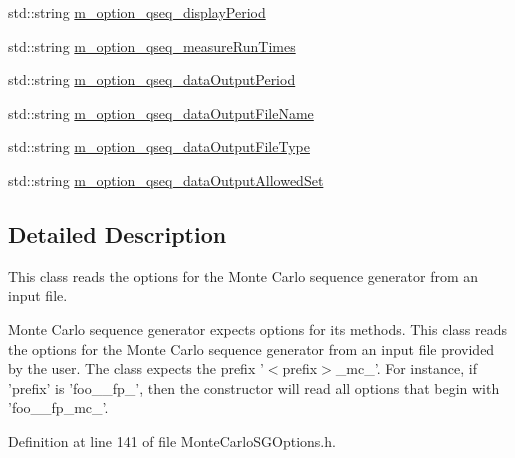 \begin{DoxyCompactItemize}
\item 
std\-::string \hyperlink{class_q_u_e_s_o_1_1_monte_carlo_s_g_options_a14d5adea03855e45e535cf10cf8ea3ae}{m\-\_\-option\-\_\-qseq\-\_\-display\-Period}
\item 
std\-::string \hyperlink{class_q_u_e_s_o_1_1_monte_carlo_s_g_options_a16456d0bcab4d4aca08b02f0ce123b07}{m\-\_\-option\-\_\-qseq\-\_\-measure\-Run\-Times}
\item 
std\-::string \hyperlink{class_q_u_e_s_o_1_1_monte_carlo_s_g_options_a604e3546503d8b7f9a8e0c48922b2ed7}{m\-\_\-option\-\_\-qseq\-\_\-data\-Output\-Period}
\item 
std\-::string \hyperlink{class_q_u_e_s_o_1_1_monte_carlo_s_g_options_a30620452f8188a0b4a0519bed24e64d1}{m\-\_\-option\-\_\-qseq\-\_\-data\-Output\-File\-Name}
\item 
std\-::string \hyperlink{class_q_u_e_s_o_1_1_monte_carlo_s_g_options_a7e07046865a2e99b61ac30b94dfc8306}{m\-\_\-option\-\_\-qseq\-\_\-data\-Output\-File\-Type}
\item 
std\-::string \hyperlink{class_q_u_e_s_o_1_1_monte_carlo_s_g_options_a2d464d948dabe4fd9fbd1e912537b3e0}{m\-\_\-option\-\_\-qseq\-\_\-data\-Output\-Allowed\-Set}
\end{DoxyCompactItemize}


\subsection{Detailed Description}
This class reads the options for the Monte Carlo sequence generator from an input file. 

Monte Carlo sequence generator expects options for its methods. This class reads the options for the Monte Carlo sequence generator from an input file provided by the user. The class expects the prefix '$<$prefix$>$\-\_\-mc\-\_\-'. For instance, if 'prefix' is 'foo\-\_\-\_\-fp\-\_\-', then the constructor will read all options that begin with 'foo\-\_\-\_\-fp\-\_\-mc\-\_\-'. 

Definition at line 141 of file Monte\-Carlo\-S\-G\-Options.\-h.



